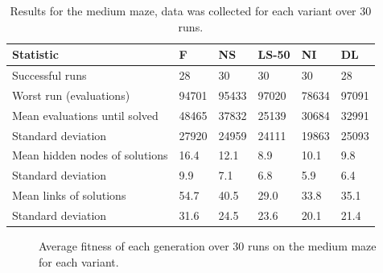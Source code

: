 \begin{table}[H]
    \centering
    \begin{tabular}{llllll}
    \toprule
    Statistic & \multicolumn{1}{l}{F} & \multicolumn{1}{l}{NS} & \multicolumn{1}{l}{LS-50} & \multicolumn{1}{l}{NI} & \multicolumn{1}{l}{DL} \\
    \midrule
    Successful runs & 28 & 30 & 30 & 30 & 28 \\
    Worst run (evaluations) & 94701 & 95433 & 97020 & 78634 & 97091 \\
    \rowcolor[gray]{.9} Mean evaluations until solved & 48465 & 37832 & 25139 & 30684 & 32991 \\
    Standard deviation & 27920  & 24959 & 24111 & 19863 & 25093 \\
    \rowcolor[gray]{.9} Mean hidden nodes of solutions & 16.4 & 12.1  & 8.9  & 10.1 & 9.8 \\
    Standard deviation & 9.9 & 7.1 & 6.8 & 5.9 & 6.4 \\
    \rowcolor[gray]{.9} Mean links of solutions & 54.7  & 40.5 & 29.0 & 33.8 & 35.1 \\
    Standard deviation & 31.6  & 24.5 & 23.6 & 20.1 & 21.4\\
    \bottomrule
    \end{tabular}
    \caption{Results for the medium maze, data was collected for each variant over 30 runs.}
    \label{medium}
\end{table}

\begin{figure}[H]
    \begin{center}
        
    \end{center}
    \caption{Average fitness of each generation over 30 runs on the medium maze for each variant.}
    \label{medium_fitness}
\end{figure}

